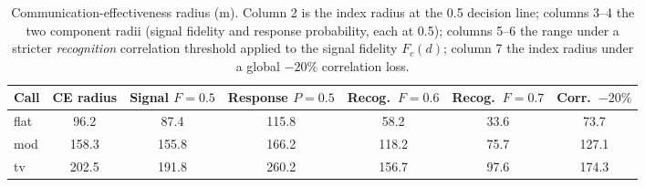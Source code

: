\begin{table}[!ht]
\centering
\setlength{\tabcolsep}{4pt}
\caption{Communication-effectiveness radius (m). Column 2 is the index radius at the
0.5 decision line; columns 3--4 the two component radii (signal fidelity and response
probability, each at 0.5); columns 5--6 the range under a stricter \emph{recognition}
correlation threshold applied to the signal fidelity $F_c(d)$; column 7 the index radius
under a global $-20\%$ correlation loss.}
\label{tab:ce}
\scriptsize
\begin{tabular}{lcccccc}
\toprule
Call & CE radius & Signal $F{=}0.5$ & Response $P{=}0.5$ & Recog.\ $F{=}0.6$ & Recog.\ $F{=}0.7$ & Corr.\ $-20\%$\\
\midrule
flat & 96.2 & 87.4 & 115.8 & 58.2 & 33.6 & 73.7\\
mod & 158.3 & 155.8 & 166.2 & 118.2 & 75.7 & 127.1\\
tv & 202.5 & 191.8 & 260.2 & 156.7 & 97.6 & 174.3\\
\bottomrule
\end{tabular}
\end{table}
